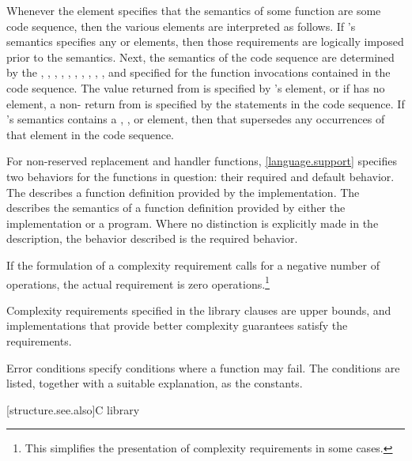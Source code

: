 \pnum
Whenever the  element specifies that the semantics of some function
 are  some code sequence, then the various elements are
interpreted as follows.
If 's semantics specifies any  or  elements,
then those requirements are logically imposed prior to the  semantics.
Next, the semantics of the code sequence are determined by the
, , , ,
, , , ,
, , and 
specified for the function invocations contained in the code sequence.
The value returned from  is specified by 's  element,
or if  has no  element,
a non- return from  is specified by the
 statements in the code sequence.
If 's semantics contains a ,
, or  element,
then that supersedes any occurrences of that element in the code sequence.

\pnum
For non-reserved replacement and handler functions,
\ref{language.support} specifies two behaviors for the functions in question:
their required and default behavior.
The 
describes a function definition provided by the implementation.
The 
describes the semantics of a function definition provided by
either the implementation or a \Cpp{} program.
Where no distinction is explicitly made in the description, the
behavior described is the required behavior.

\pnum
If the formulation of a complexity requirement calls for a negative number of
operations, the actual requirement is zero operations.\footnote{This simplifies
the presentation of complexity requirements in some cases.}

\pnum
Complexity requirements specified in the library clauses are upper bounds,
and implementations that provide better complexity guarantees satisfy
the requirements.

\pnum
Error conditions specify conditions where a function may fail. The conditions
are listed, together with a suitable explanation, as the 
constants.

[structure.see.also]{C library}

